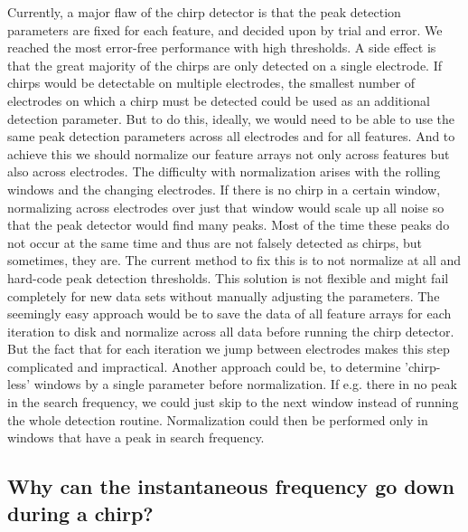 Currently, a major flaw of the chirp detector is that the peak detection parameters are fixed for each feature, and decided upon by trial and error. We reached the most error-free performance with high thresholds. A side effect is that the great majority of the chirps are only detected on a single electrode. If chirps would be detectable on multiple electrodes, the smallest number of electrodes on which a chirp must be detected could be used as an additional detection parameter. But to do this, ideally, we would need to be able to use the same peak detection parameters across all electrodes and for all features. And to achieve this we should normalize our feature arrays not only across features but also across electrodes. The difficulty with normalization arises with the rolling windows and the changing electrodes. If there is no chirp in a certain window, normalizing across electrodes over just that window would scale up all noise so that the peak detector would find many peaks. Most of the time
 these peaks do not occur at the same time and thus are not falsely detected as chirps, but sometimes, they are. The current method to fix this is to not normalize at all and hard-code peak detection thresholds. This solution is not flexible and might fail completely for new data sets without manually adjusting the parameters. The seemingly easy approach would be to save the data of all feature arrays for each iteration to disk and normalize across all data before running the chirp detector. But the fact that for each iteration we jump between electrodes makes this step complicated and impractical. Another approach could be, to determine 'chirp-less' windows by a single parameter before normalization. If e.g. there in no peak in the search frequency, we could just skip to the next window instead of running the whole detection routine. Normalization could then be performed only in windows that have a peak in search frequency. 

\subsection{Why can the instantaneous frequency go down during a chirp?} \label{ref:insta}

